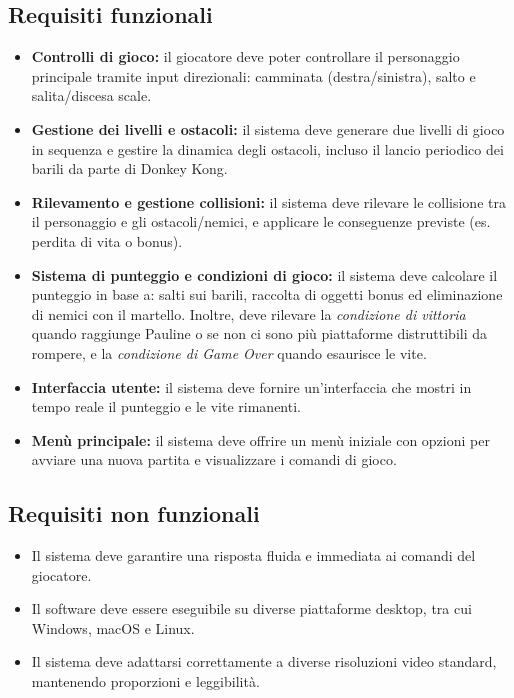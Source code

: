 \documentclass[a4paper,12pt]{report}
\begin{document}
\subsection*{Requisiti funzionali}
\begin{itemize}
	\item \textbf{Controlli di gioco:}
	      il giocatore deve poter controllare il personaggio principale tramite input direzionali: camminata (destra/sinistra), salto e salita/discesa scale.
	\item \textbf{Gestione dei livelli e ostacoli:}
	      il sistema deve generare due livelli di gioco in sequenza e gestire la dinamica degli ostacoli, incluso il lancio periodico dei barili da parte di Donkey Kong.
	\item \textbf{Rilevamento e gestione collisioni:}
	      il sistema deve rilevare le collisione tra il personaggio e gli ostacoli/nemici, e applicare le conseguenze previste (es. perdita di vita o bonus).
	\item  \textbf{Sistema di punteggio e condizioni di gioco:}
	      il sistema deve calcolare il punteggio in base a: salti sui barili, raccolta di oggetti bonus ed eliminazione di nemici con il martello.
	      Inoltre, deve rilevare la \textit{condizione di vittoria} quando raggiunge Pauline o se non ci sono più piattaforme distruttibili da rompere, e
	      la \textit{condizione di Game Over} quando esaurisce le vite.
	\item \textbf{Interfaccia utente:}
	      il sistema deve fornire un'interfaccia che mostri in tempo reale il punteggio e  le vite rimanenti.
	\item \textbf{Menù principale:}
	      il sistema deve offrire un menù iniziale con opzioni per avviare una nuova partita e visualizzare i comandi di gioco.
\end{itemize}

\subsection*{Requisiti non funzionali}
\begin{itemize}
	\item Il sistema deve garantire una risposta fluida e immediata ai comandi del giocatore.
	\item Il software deve essere eseguibile su diverse piattaforme desktop, tra cui Windows, macOS e Linux.
	\item Il sistema deve adattarsi correttamente a diverse risoluzioni video standard, mantenendo proporzioni e leggibilità.
\end{itemize}
\end{document}
